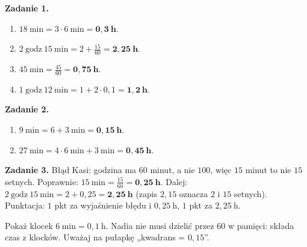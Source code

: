 \documentclass[11pt,a4paper]{article}
\begin{document}

\vspace{0.6em}
\textbf{Zadanie 1.}
\begin{enumerate}[label=\alph*), leftmargin=*, itemsep=4pt]
  \item $18\ \text{min}=3\cdot 6\ \text{min}=\mathbf{0{,}3\ h}$.
  \item $2\ \text{godz}\ 15\ \text{min}=2+\frac{15}{60}=\mathbf{2{,}25\ h}$.
  \item $45\ \text{min}=\frac{45}{60}=\mathbf{0{,}75\ h}$.
  \item $1\ \text{godz}\ 12\ \text{min}=1+2\cdot 0{,}1=\mathbf{1{,}2\ h}$.
\end{enumerate}

\textbf{Zadanie 2.}
\begin{enumerate}[label=\alph*), leftmargin=*, itemsep=4pt]
  \item $9\ \text{min}=6+3\ \text{min}=\mathbf{0{,}15\ h}$.
  \item $27\ \text{min}=4\cdot 6\ \text{min}+3\ \text{min}=\mathbf{0{,}45\ h}$.
\end{enumerate}

\textbf{Zadanie 3.} Błąd Kasi: godzina ma $60$ minut, a nie $100$, więc $15$ minut to nie $15$ setnych. Poprawnie: $15\ \text{min}=\frac{15}{60}=\mathbf{0{,}25\ h}$. Dalej: $2\ \text{godz}\ 15\ \text{min}=2+0{,}25=\mathbf{2{,}25\ h}$ (zapis $2{,}15$ oznacza $2$ i $15$ setnych). Punktacja: $1$ pkt za wyjaśnienie błędu i $0{,}25\ \text{h}$, $1$ pkt za $2{,}25\ \text{h}$.

\vspace{0.6em}
\begin{tcolorbox}[colback=white, colframe=okres, boxrule=0.6pt, arc=2pt, title=Wskazówka dla Pawła]
Pokaż klocek $6\ \text{min}=0{,}1\ \text{h}$. Nadia nie musi dzielić przez $60$ w pamięci: składa czas z klocków. Uważaj na pułapkę „kwadrans = $0{,}15$”.
\end{tcolorbox}
\end{document}
